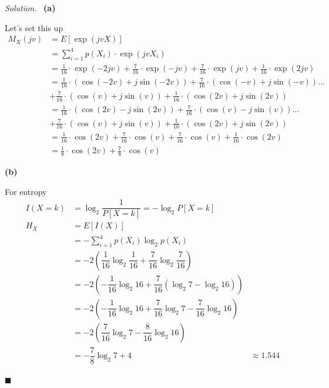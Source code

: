 \documentclass[11pt]{article}
\newenvironment{solution}
{\par\medskip\noindent\textit{Solution.}\ }
{\hfill$\blacksquare$\par\medskip}
\begin{document}
    \begin{solution}
        \textbf{(a)}

        Let's set this up
        \begin{align*}
            M_X(jv) &= E[\exp(jvX)] \\
            &= \sum_{i = 1}^{4} p(X_i) \cdot \exp(jvX_i) \\
            &= \frac{1}{16} \cdot \exp(-2jv) + \frac{7}{16} \cdot \exp(-jv) + \frac{7}{16} \cdot \exp(jv) + \frac{1}{16} \cdot \exp(2jv) \\
            &= \frac{1}{16} \cdot (\cos(-2v) + j \sin(-2v)) + \frac{7}{16} \cdot (\cos(-v) + j \sin(-v)) \dots \\
            &+ \frac{7}{16} \cdot (\cos(v) + j \sin(v)) + \frac{1}{16} \cdot (\cos(2v) + j \sin(2v)) \\
            &= \frac{1}{16} \cdot (\cos(2v) - j \sin(2v)) + \frac{7}{16} \cdot (\cos(v) - j \sin(v)) \dots \\
            &+ \frac{7}{16} \cdot (\cos(v) + j \sin(v)) + \frac{1}{16} \cdot (\cos(2v) + j \sin(2v)) \\
            &= \frac{1}{16} \cdot \cos(2v) + \frac{7}{16} \cdot \cos(v) + \frac{7}{16} \cdot \cos(v) + \frac{1}{16} \cdot \cos(2v) \\
            &= \frac{1}{8} \cdot \cos(2v) + \frac{7}{8} \cdot \cos(v)
        \end{align*}

        \vspace{1em}
        \textbf{(b)}

        For entropy
        \begin{align*}
            I(X = k) &= \log_2{\dfrac{1}{P[X = k]}} = - \log_2{P[X = k]} \\
            H_X &= E[I(X)] \\
            &= - \sum_{i = 1}^{4} p(X_i) \log_2{ p(X_i) } \\
            &= - 2 (\dfrac{1}{16} \log_2{\dfrac{1}{16}} + \dfrac{7}{16} \log_2{\dfrac{7}{16}}) \\
            &= - 2 (- \dfrac{1}{16} \log_2 {16} + \dfrac{7}{16} (\log_2{7} - \log_2{16})) \\
            &= - 2 (- \dfrac{1}{16} \log_2 {16} + \dfrac{7}{16} \log_2{7} - \dfrac{7}{16} \log_2{16}) \\
            &= - 2 (\dfrac{7}{16} \log_2{7} - \dfrac{8}{16} \log_2{16}) \\
            &= - \dfrac{7}{8} \log_2{7} + 4
            &\approx 1.544
        \end{align*}


\end{solution}
\end{document}
